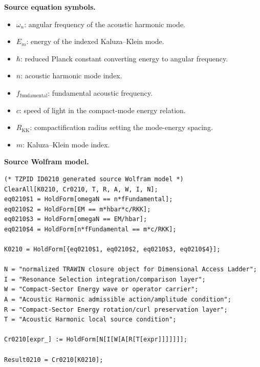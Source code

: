 \begin{minipage}[t]{0.49\linewidth}
\begingroup
\small
\raggedright
\textbf{Source equation symbols.}\par
\begin{itemize}[leftmargin=1.35em,itemsep=1pt,topsep=1pt,parsep=0pt]
    \item $\omega_n$: angular frequency of the acoustic harmonic mode.
    \item $E_m$: energy of the indexed Kaluza--Klein mode.
    \item $\hbar$: reduced Planck constant converting energy to angular frequency.
    \item $n$: acoustic harmonic mode index.
    \item $f_{\mathrm{fundamental}}$: fundamental acoustic frequency.
    \item $c$: speed of light in the compact-mode energy relation.
    \item $R_{\mathrm{KK}}$: compactification radius setting the mode-energy spacing.
    \item $m$: Kaluza--Klein mode index.
\end{itemize}
\endgroup
\end{minipage}\hfill
\begin{minipage}[t]{0.47\linewidth}
\begingroup
\scriptsize
\raggedright
\textbf{Source Wolfram model.}\par
\begin{Verbatim}[fontsize=\tiny,breaklines=true,breakanywhere=true]
(* TZPID ID0210 generated source Wolfram model *)
ClearAll[K0210, Cr0210, T, R, A, W, I, N];
eq0210$1 = HoldForm[omegaN == n*fFundamental];
eq0210$2 = HoldForm[EM == m*hbar*c/RKK];
eq0210$3 = HoldForm[omegaN == EM/hbar];
eq0210$4 = HoldForm[n*fFundamental == m*c/RKK];

K0210 = HoldForm[{eq0210$1, eq0210$2, eq0210$3, eq0210$4}];

N = "normalized TRAWIN closure object for Dimensional Access Ladder";
I = "Resonance Selection integration/comparison layer";
W = "Compact-Sector Energy wave or operator carrier";
A = "Acoustic Harmonic admissible action/amplitude condition";
R = "Compact-Sector Energy rotation/curl preservation layer";
T = "Acoustic Harmonic local source condition";

Cr0210[expr_] := HoldForm[N[I[W[A[R[T[expr]]]]]]];

Result0210 = Cr0210[K0210];
\end{Verbatim}
\endgroup
\end{minipage}

